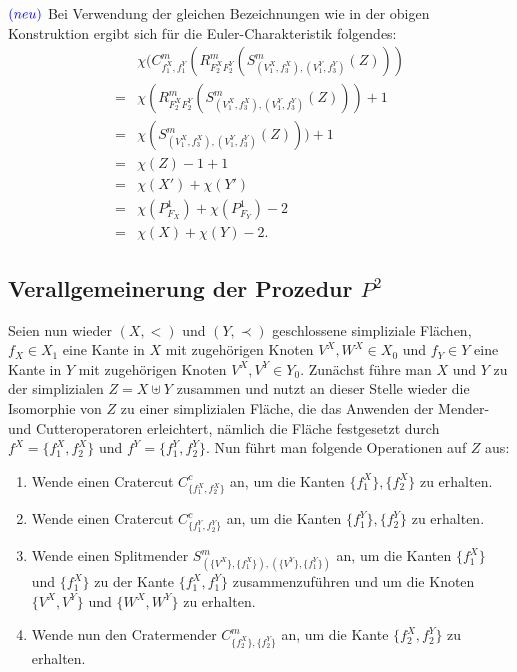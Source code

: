 \documentclass[12pt,titlepage]{article}
\begin{document}
$\textcolor{blue}{(neu)}$
Bei Verwendung der gleichen Bezeichnungen wie in der obigen Konstruktion ergibt sich für die Euler-Charakteristik folgendes:
\begin{align*}
&\chi(C^m_{f_1^X,f_1^Y}(R^m_{F_2^X F_2^Y}(S^m_{(V_1^X,f_3^X),(V_1^Y,f_3^Y)}(Z)))\\
=&\chi(R^m_{F_2^X F_2^Y}(S^m_{(V_1^X,f_3^X),(V_1^Y,f_3^Y)}(Z)))+1\\
=&\chi(S^m_{(V_1^X,f_3^X),(V_1^Y,f_3^Y)}(Z)))+1\\
=&\chi(Z)-1+1\\
=&\chi(X')+\chi(Y')\\
=&\chi(P^1_{F_X})+\chi(P^1_{F_Y})-2\\
=&\chi(X)+ \chi(Y)-2.
\end{align*}

  \subsection{Verallgemeinerung der Prozedur $P^2$}
Seien nun wieder $(X,<)$ und $(Y,\prec)$ geschlossene simpliziale Flächen, $f_X\in X_1$ eine Kante in $X$ mit zugehörigen Knoten $V^X,W^X \in X_0$ und $f_Y\in Y$ eine Kante in $Y$ mit zugehörigen Knoten $V^X,V^Y\in Y_0$. Zunächst führe man $X$ und $Y$ zu der simplizialen $Z=X \uplus Y$ zusammen und nutzt an dieser Stelle wieder die Isomorphie von $Z$ zu einer simplizialen Fläche, die das Anwenden der Mender- und Cutteroperatoren erleichtert, nämlich die Fläche festgesetzt durch $f^X=\{f_1^X,f^X_2\}$ und $f^Y=\{f_1^Y,f^Y_2\}$. Nun führt man folgende Operationen auf $Z$ aus:
\begin{enumerate}
 \item Wende einen Cratercut $C^c_{\{f_1^X,f_2^X\}}$ an, um die Kanten $\{f_1^X\},\{f_2^X\}$ zu erhalten.
 \item Wende einen Cratercut $C^c_{\{f_1^Y,f_2^Y\}}$ an, um die Kanten $\{f_1^Y\},\{{f_2^Y}\}$ zu erhalten.
\item Wende einen Splitmender $S^m_{(\{V^X\},\{f_1^X\}),(\{V^Y\},\{f_1^Y\})}$ an, um die Kanten $\{f_1^X\}$ und $\{{f_1^X}\}$ zu der Kante $\{f_1^X,f_1^Y\}$ zusammenzuführen und um die Knoten $\{V^X,V^Y\}$ und $\{W^X,W^Y\}$ zu erhalten.
 \item Wende nun den Cratermender $C^m_{\{f_2^X\},\{{f_2^Y}\}}$ an, um die Kante $\{f_2^X,f_2^Y\}$ zu erhalten.
 \end{enumerate}
 
\end{document}
